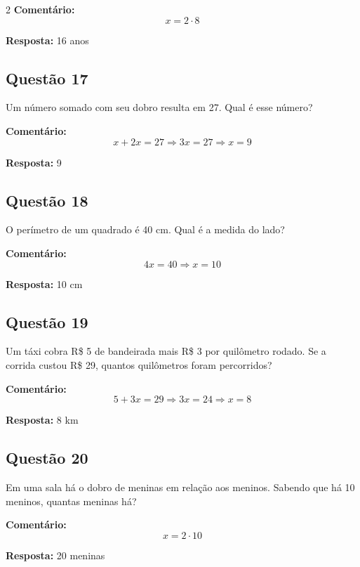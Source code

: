 \documentclass[11pt]{article}
\begin{document}
\begin{multicols}{2}
\textbf{Comentário:}
\[
x = 2 \cdot 8
\]

\textbf{Resposta:} 16 anos

\subsection*{Questão 17}
Um número somado com seu dobro resulta em 27. Qual é esse número?

\textbf{Comentário:}
\[
x + 2x = 27
\Rightarrow 3x = 27
\Rightarrow x = 9
\]

\textbf{Resposta:} 9

\subsection*{Questão 18}
O perímetro de um quadrado é 40 cm. Qual é a medida do lado?

\textbf{Comentário:}
\[
4x = 40
\Rightarrow x = 10
\]

\textbf{Resposta:} 10 cm

\subsection*{Questão 19}
Um táxi cobra R\$ 5 de bandeirada mais R\$ 3 por quilômetro rodado. Se a corrida custou R\$ 29, quantos quilômetros foram percorridos?

\textbf{Comentário:}
\[
5 + 3x = 29
\Rightarrow 3x = 24
\Rightarrow x = 8
\]

\textbf{Resposta:} 8 km

\subsection*{Questão 20}
Em uma sala há o dobro de meninas em relação aos meninos. Sabendo que há 10 meninos, quantas meninas há?

\textbf{Comentário:}
\[
x = 2 \cdot 10
\]

\textbf{Resposta:} 20 meninas

\end{multicols}
\end{document}
